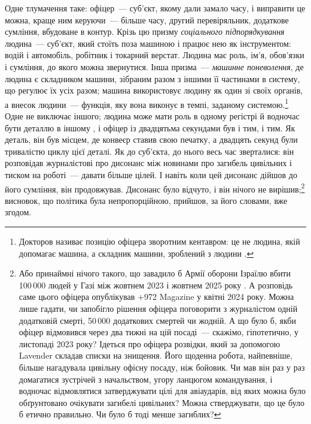 Одне тлумачення таке: офіцер~— суб’єкт, якому дали замало часу, і виправити це можна, краще ним керуючи~— більше часу, другий перевіряльник, додаткове сумління, вбудоване в контур. Крізь цю призму \emph{соціального підпорядкування} людина~— суб’єкт, який стоїть поза машиною і працює нею як інструментом: водій і автомобіль, робітник і токарний верстат. Людина має роль, ім’я, обов’язки і сумління, до якого можна звернутися. Інша призма~— \emph{машинне поневолення}, де людина є складником машини, зібраним разом з іншими її частинами в систему, що регулює їх усіх разом; машина використовує людину як один зі своїх органів, а внесок людини~— функція, яку вона виконує в темпі, заданому системою.\footnote{Докторов називає позицію офіцера зворотним кентавром: це не людина, якій допомагає машина, а складник машини, зроблений з людини \autocite{doctorow2026reversecentaur}.} Одне не виключає іншого; людина може мати роль в одному регістрі й водночас бути деталлю в іншому \autocite[Плато 13, «The Apparatus of Capture»: поневолення є там, де люди самі є складовими частинами машини, яку вони утворюють між собою та з іншими речами під контролем і керівництвом вищої єдності, а підпорядкування~— там, де вища єдність конституює людину як суб’єкта, пов’язаного з новим зовнішнім об’єктом, яким може бути тварина, інструмент або навіть машина]{deleuze1987plateaus}, і офіцер із двадцятьма секундами був і тим, і тим. Як деталь, він був місцем, де конвеєр ставив свою печатку, а двадцять секунд були тривалістю циклу цієї деталі. Як до суб’єкта, до нього весь час зверталися: він розповідав журналістові про дисонанс між новинами про загибель цивільних і тиском на роботі~— давати більше цілей. І навіть коли цей дисонанс дійшов до його сумління, він продовжував. Дисонанс було відчуто, і він нічого не вирішив;\footnote{Або принаймні нічого такого, що завадило б Армії оборони Ізраїлю вбити 100\,000 людей у Газі між жовтнем 2023 і жовтнем 2025 року \autocite{gomezugarte2025uncertainty,acosta2026gaza,economist2025gaza}. А розповідь саме цього офіцера опублікував +972 Magazine у квітні 2024 року. Можна лише гадати, чи запобігло рішення офіцера поговорити з журналістом одній додатковій смерті, 50\,000 додаткових смертей чи жодній. А що було б, якби офіцер відмовився через два тижні на цій посаді~— скажімо, гіпотетично, у листопаді 2023 року? Ідеться про офіцера розвідки, який за допомогою Lavender складав списки на знищення. Його щоденна робота, найпевніше, більше нагадувала цивільну офісну посаду, ніж бойовик. Чи мав він раз у раз домагатися зустрічей з начальством, угору ланцюгом командування, і водночас відмовлятися затверджувати цілі для авіаударів, від яких можна було обґрунтовано очікувати загибелі цивільних? Можна стверджувати, що це було б етично правильно. Чи було б тоді менше загиблих?} висновок, що політика була непропорційною, прийшов, за його словами, вже згодом.

